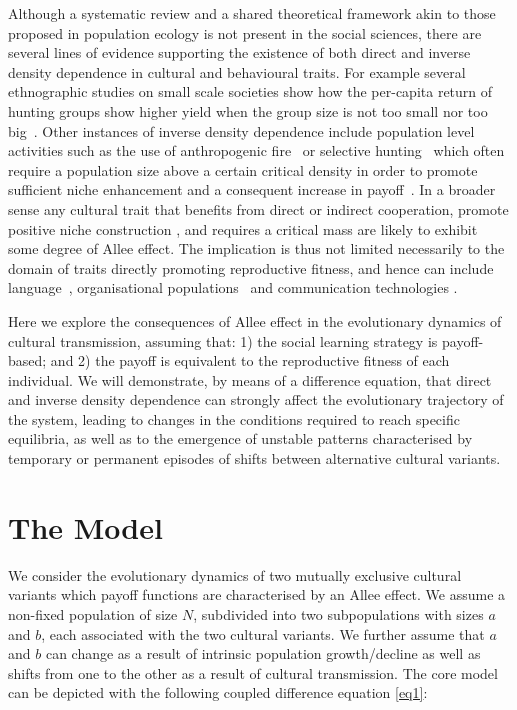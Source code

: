 \documentclass[review,authoryear]{elsarticle}
\begin{document}
Although a systematic review and a shared theoretical framework akin to those proposed in population ecology \citep{kramer_etal_2009} is not present in the social sciences, there are several lines of evidence supporting the existence of both direct and inverse density dependence in cultural and behavioural traits. For example several ethnographic studies on small scale societies show how the per-capita return of hunting groups show higher yield when the group size is not too small nor too big~\citep{hill_and_hawkes_1983,janssen_and_hill_2014}. Other instances of inverse density dependence include population level activities such as the use of anthropogenic fire~\citep{bird2013} or selective hunting~\citep{dods_2002} which often require a population size above a certain critical density in order to promote sufficient niche enhancement and a consequent increase in payoff~\citep{rowley-conwy_and_layton_2011}. In a broader sense any cultural trait that benefits from direct or indirect cooperation, 
promote positive niche construction \citep{vandermeer_2008}, and requires a critical mass \citep{rogers_2003} are likely to exhibit some degree of Allee effect. The implication is thus not limited necessarily to the domain of traits directly promoting reproductive fitness, and hence can include language~\citep{kandler2009}, organisational populations~\citep{caroll_and_hannan_1989} and communication technologies \citep{van_slyke_perceived_2007}.

Here we explore the consequences of Allee effect in the evolutionary dynamics of cultural transmission, assuming that: 1) the social learning strategy is payoff-based; and 2)  the payoff is equivalent to the reproductive fitness of each individual. We will demonstrate, by means of a difference equation, that direct and inverse density dependence can strongly affect the evolutionary trajectory of the system, leading to changes in the conditions required to reach specific equilibria, as well as to the emergence of unstable patterns characterised by temporary or permanent episodes of shifts between alternative cultural variants.

\section{The Model}
We consider the evolutionary dynamics of two mutually exclusive cultural variants which payoff functions are characterised by an Allee effect. We assume a non-fixed population of size $N$, subdivided into two subpopulations with sizes $a$ and $b$, each associated with the two cultural variants. We further assume that $a$ and $b$ can change as a result of intrinsic population growth/decline as well as shifts from one to the other as a result of cultural transmission. The core model can be depicted with the following coupled difference equation \eqref{eq1}:
\end{document}
